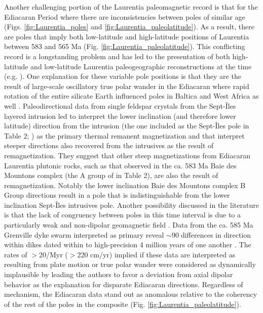 \documentclass[11pt,letterpaper]{article}
\begin{document}
Another challenging portion of the Laurentia paleomagnetic record is that for the Ediacaran Period where there are inconsistencies between poles of similar age (Figs. \ref{fig:Laurentia_poles} and \ref{fig:Laurentia_paleolatitude}). As a result, there are poles that imply both low-latitude and high-latitude positions of Laurentia between 583 and 565 Ma (Fig. \ref{fig:Laurentia_paleolatitude}). This conflicting record is a longstanding problem and has led to the presentation of both high-latitude and low-latitude Laurentia paleogeographic reconstructions at the time (e.g. \citealp{Pisarevsky2001a,Li2008a}). One explanation for these variable pole positions is that they are the result of large-scale oscillatory true polar wander in the Ediacaran where rapid rotation of the entire silicate Earth influenced poles in Baltica and West Africa as well \citep{McCausland2007a, Robert2017a}. Paleodirectional data from single feldspar crystals from the Sept-\^Iles layered intrusion led \cite{Bono2015a} to interpret the lower inclination (and therefore lower latitude) direction from the intrusion (the one included as the Sept-\^Iles pole in Table 2; \citealp{Tanczyk1987a}) as the primary thermal remanent magnetization and that interpret steeper directions also recovered from the intrusives as the result of remagnetization. They suggest that other steep magnetizations from Ediacaran Laurentia plutonic rocks, such as that observed in the ca. 583 Ma Baie des Mountons complex (the A group of \cite{McCausland2011a} in Table 2), are also the result of remagnetization. Notably the lower inclination Baie des Mountons complex B Group directions result in a pole that is indistinguishable from the lower inclination  Sept-\^Iles intrusives pole. Another possibility discussed in the literature is that the lack of congruency between poles in this time interval is due to a particularly weak and non-dipolar geomagnetic field \citep{Abrajevitch2010a, Halls2015a, Bono2019a}. Data from the ca. 585 Ma Grenville dyke swarm interpreted as primary reveal $\sim$90\textdegree$\;$differences in direction within dikes dated within to high-precision 4 million years of one another \citep{Halls2015a}. The rates of $>$20\textdegree /Myr ($>$220 cm/yr) implied if these data are interpreted as resulting from plate motion or true polar wander were considered as dynamically implausible by \cite{Halls2015a} leading the authors to favor a deviation from axial dipolar behavior as the explanation for disparate Ediacaran directions.  Regardless of mechanism, the Ediacaran data stand out as anomalous relative to the coherency of the rest of the poles in the composite (Fig. \ref{fig:Laurentia_paleolatitude}). 
\end{document}
